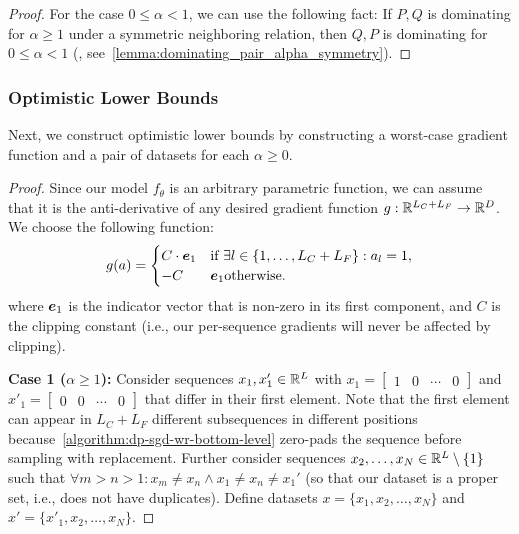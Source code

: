 \begin{proof}
    For the case $0 \leq \alpha < 1$, we can use the following fact:
    If $P,Q$ is dominating for $\alpha \geq 1$ under a symmetric neighboring relation,
    then $Q, P$ is dominating for $0 \leq \alpha < 1$ (\citet{zhu2022optimal}, see~\cref{lemma:dominating_pair_alpha_symmetry}).
\end{proof}

\subsubsection{Optimistic Lower Bounds}\label{appendix:deterministic_top_wr_bottom_lower_bounds}
Next, we construct optimistic lower bounds by constructing a worst-case gradient function and a pair of datasets 
for each $\alpha \geq 0$.
\deterministictoplevelwroptimistic*
\begin{proof}
    Since our model $f_\theta$ is an arbitrary parametric function,
    we can assume that it is the anti-derivative of any desired gradient function $g : {\mathbb{R}}^{L_C + L_F} \rightarrow {\mathbb{R}}^D$.
    We choose the following function:
    \begin{equation*}
        g(a) = \begin{cases}
            C \cdot {\bm{e}}_1 & \text{if } \exists l \in \{1,\dots,L_C + L_F\} : a_l = 1, \\
            -C & {\bm{e}}_1 \text{otherwise.}
        \end{cases}
    \end{equation*}
    where ${\bm{e}}_1$ is the indicator vector that is non-zero in its first component, 
    and $C$ is the clipping constant (i.e., our per-sequence gradients will never be affected by clipping).
     

    \textbf{Case 1 ($\alpha \geq 1$):}
    Consider sequences $x_1, x'_1 \in {\mathbb{R}}^{L}$ with
    $x_1 = \begin{bmatrix}
        1 & 0 & \cdots & 0
    \end{bmatrix}$
    and 
    $x'_1 = \begin{bmatrix}
        0 & 0 & \cdots & 0
    \end{bmatrix}$
    that differ in their first element.
    Note that the first element can appear in $L_C + L_F$ different subsequences in different positions because~\cref{algorithm:dp-sgd-wr-bottom-level} zero-pads the sequence before sampling with replacement.
    Further consider sequences $x_2,\dots,x_N \in {\mathbb{R}}^L \setminus \{1\}$ such that $\forall m > n > 1 : x_m \neq x_n \land x_1 \neq x_n \neq x_1'$ (so that our dataset is a proper set, i.e., does not have duplicates).
    Define datasets $x = \{x_1,x_2,\dots,x_N\}$ and $x' = \{x'_1,x_2,\dots,x_N\}$.
    

\end{proof}
